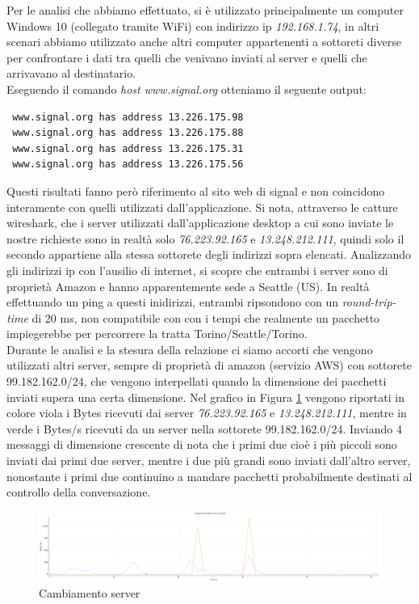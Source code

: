 \documentclass{article}
\begin{document}
Per le analisi che abbiamo effettuato, si è utilizzato principalmente un computer Windows 10 (collegato
   tramite WiFi) con indirizzo ip \textit{192.168.1.74}, in altri scenari
   abbiamo utilizzato anche altri computer appartenenti a sottoreti diverse per confrontare i dati tra quelli che venivano inviati al server e quelli che 
   arrivavano al destinatario.\\
   Eseguendo il comando \textit{host www.signal.org} otteniamo il seguente output:\\
   \vspace{-20pt}
   \begin{verbatim}
 www.signal.org has address 13.226.175.98
 www.signal.org has address 13.226.175.88
 www.signal.org has address 13.226.175.31
 www.signal.org has address 13.226.175.56
   \end{verbatim}
   \vspace{-20pt}
   Questi risultati fanno però riferimento al sito web di signal e non coincidono interamente con quelli 
utilizzati dall'applicazione.
Si nota, attraverso le catture wireshark, che i server utilizzati dall'applicazione desktop a cui sono inviate le nostre richieste 
sono in realtà solo \textit{76.223.92.165 } e \textit{13.248.212.111}, quindi solo il secondo appartiene alla stessa 
sottorete degli indirizzi sopra elencati.
Analizzando gli indirizzi ip con l'ausilio di internet, si scopre che entrambi i server sono di proprietà Amazon 
e hanno apparentemente sede a Seattle (US). In realtà effettuando un ping a questi inidirizzi, entrambi ripsondono con un 
\textit{round-trip-time} di 20 ms, non compatibile con con i tempi che realmente un pacchetto impiegerebbe 
per percorrere la tratta Torino/Seattle/Torino. \\
Durante le analisi e la stesura della relazione ci siamo accorti che vengono utilizzati altri server, sempre di proprietà di amazon (servizio AWS) con sottorete 99.182.162.0/24,
che vengono interpellati quando la dimensione dei pacchetti inviati supera una certa dimensione. Nel grafico in Figura \ref{ServChan} vengono riportati in colore viola i Bytes 
ricevuti dai server \textit{76.223.92.165 } e \textit{13.248.212.111}, mentre in verde i Bytes/s ricevuti da un server nella sottorete 99.182.162.0/24. Inviando 4 messaggi
di dimensione crescente di nota che i primi due cioè i più piccoli sono inviati dai primi due server, mentre i due più grandi sono inviati dall'altro server, nonostante
i primi due continuino a mandare pacchetti probabilmente destinati al controllo della conversazione. \\ 
\begin{figure}[h]
  \includegraphics[width=1\textwidth]{serverChanges.png}
  \vspace{-20pt}
  \caption{Cambiamento server}\label{ServChan}
\end{figure}
\end{document}
